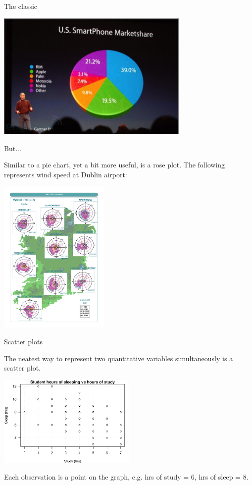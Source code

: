 \documentclass[12pt,xcolor=dvipsnames,handout,mathserif,aspectratio=169]{beamer}
\begin{document}
\begin{frame}{ The classic }

\begin{center}
\includegraphics[width=0.7\textwidth]{apple.png}
\end{center}

\end{frame}

\begin{frame}{ But... }

Similar to a pie chart, yet a bit more useful, is a rose plot. The following represents wind speed at Dublin airport:
\begin{center}
\includegraphics[width=0.4\textwidth]{GoodPieChart.pdf}
\end{center}

\end{frame}


\begin{frame}{ Scatter plots }

The neatest way to represent two quantitative variables simultaneously is a scatter plot. 
\begin{center}
\includegraphics[width=0.5\textwidth]{StudySleepScatter.pdf}
\end{center}
\pause
Each observation is a point on the graph, e.g. hrs of study = 6, hrs of sleep = 8.

\end{frame}
\end{document}
